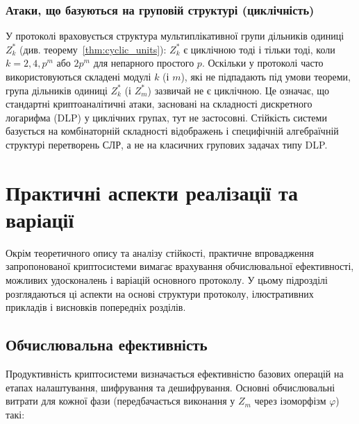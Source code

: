 \subsubsection{Атаки, що базуються на груповій структурі (циклічність)}
\label{subsubsec:group_structure}
У протоколі враховується структура мультиплікативної групи дільників одиниці $Z_k^*$ (див. теорему~\ref{thm:cyclic_units}): $Z_k^*$ є циклічною тоді і тільки тоді, коли $k=2,4,p^m$ або $2p^m$ для непарного простого $p$. Оскільки у протоколі часто використовуються складені модулі $k$ (і $m$), які не підпадають під умови теореми, група дільників одиниці $Z_k^*$ (і $Z_m^*$) зазвичай не є циклічною. Це означає, що стандартні криптоаналітичні атаки, засновані на складності дискретного логарифма (DLP) у циклічних групах, тут не застосовні. Стійкість системи базується на комбінаторній складності відображень і специфічній алгебраїчній структурі перетворень СЛР, а не на класичних групових задачах типу DLP.


\section{Практичні аспекти реалізації та варіації}
\label{sec:implementation_considerations}
Окрім теоретичного опису та аналізу стійкості, практичне впровадження запропонованої криптосистеми вимагає врахування обчислювальної ефективності, можливих удосконалень і варіацій основного протоколу.
У цьому підрозділі розглядаються ці аспекти на основі структури протоколу, ілюстративних прикладів і висновків попередніх розділів.

\subsection{Обчислювальна ефективність}
\label{subsec:computational_efficiency}
Продуктивність криптосистеми визначається ефективністю базових операцій на етапах налаштування, шифрування та дешифрування.
Основні обчислювальні витрати для кожної фази (передбачається виконання у $Z_m$ через ізоморфізм $\varphi$) такі:

